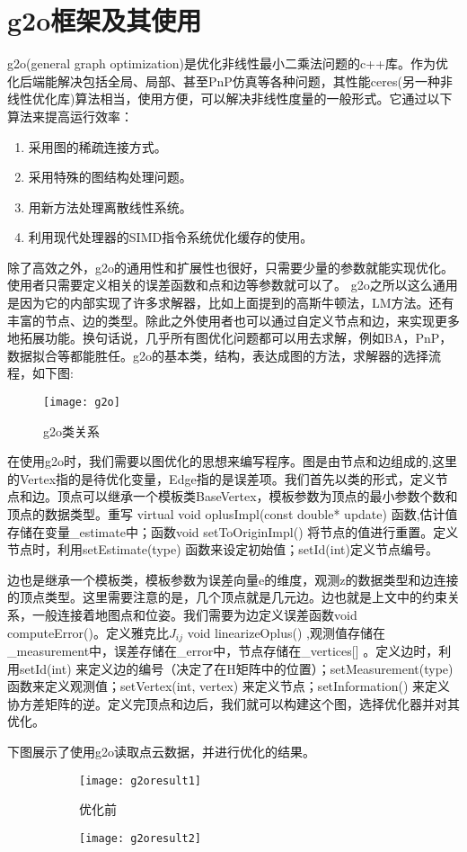 \section{g2o框架及其使用}
g2o(general graph optimization)是优化非线性最小二乘法问题的c++库。作为优化后端能解决包括全局、局部、甚至PnP仿真等各种问题，其性能ceres(另一种非线性优化库)算法相当，使用方便，可以解决非线性度量的一般形式。它通过以下算法来提高运行效率：
\begin{enumerate}[(1)]
	\item 采用图的稀疏连接方式。
	\item 采用特殊的图结构处理问题。
	\item 用新方法处理离散线性系统。
	\item 利用现代处理器的SIMD指令系统优化缓存的使用。
\end{enumerate}
\par
除了高效之外，g2o的通用性和扩展性也很好，只需要少量的参数就能实现优化。使用者只需要定义相关的误差函数和点和边等参数就可以了。
g2o之所以这么通用是因为它的内部实现了许多求解器，比如上面提到的高斯牛顿法，LM方法。还有丰富的节点、边的类型。除此之外使用者也可以通过自定义节点和边，来实现更多地拓展功能。换句话说，几乎所有图优化问题都可以用去求解，例如BA，PnP，数据拟合等都能胜任。g2o的基本类，结构，表达成图的方法，求解器的选择流程，如下图:\par
\begin{figure}[H]
	\centering
	\texttt{[image: g2o]}
	\caption{g2o类关系}
\end{figure}
在使用g2o时，我们需要以图优化的思想来编写程序。图是由节点和边组成的,这里的Vertex指的是待优化变量，Edge指的是误差项。我们首先以类的形式，定义节点和边。顶点可以继承一个模板类BaseVertex，模板参数为顶点的最小参数个数和顶点的数据类型。重写 virtual void oplusImpl(const double* update) 函数,估计值存储在变量\_estimate中；函数void setToOriginImpl() 将节点的值进行重置。定义节点时，利用setEstimate(type) 函数来设定初始值；setId(int)定义节点编号。\par
边也是继承一个模板类，模板参数为误差向量e的维度，观测z的数据类型和边连接的顶点类型。这里需要注意的是，几个顶点就是几元边。边也就是上文中的约束关系，一般连接着地图点和位姿。我们需要为边定义误差函数void computeError()。定义雅克比$J_{ij}$ void linearizeOplus() ,观测值存储在\_measurement中，误差存储在\_error中，节点存储在\_vertices[] 。定义边时，利用setId(int) 来定义边的编号（决定了在H矩阵中的位置）；setMeasurement(type) 函数来定义观测值；setVertex(int, vertex) 来定义节点；setInformation() 来定义协方差矩阵的逆。定义完顶点和边后，我们就可以构建这个图，选择优化器并对其优化。\par
下图展示了使用g2o读取点云数据，并进行优化的结果。
\begin{figure}[H]
	\centering
	\begin{subfigure}[ht]{0.4\textwidth}
		\centering
		\texttt{[image: g2oresult1]}
		\caption{优化前}
	\end{subfigure}
	\quad
	\begin{subfigure}[ht]{0.4\textwidth}
		\centering
		\texttt{[image: g2oresult2]}
	\end{subfigure}\\
\end{figure}
